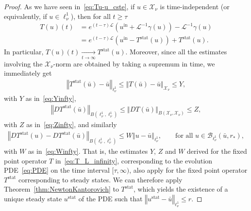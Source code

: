 \documentclass[10pt,a4paper]{article}
\theoremstyle{plain}
\newcommand{\B}{\mathcal{B}}
\renewcommand{\B}{\mathcal{B}}
\renewcommand{\L}{\mathcal{L}}
\newcommand{\X}{\mathcal{X}}
\newcommand{\bu}{\bar{u}}
\newcommand{\1}{\mathbf{1}}
\newcommand{\rstar}{r_*}
\newcommand{\uin}{{u^{\mathrm{in}}}}
\newcommand{\stat}{\mathrm{stat}}
\begin{document}
\begin{proof}
As we have seen in~\eqref{eq:Tu-u_cste}, if $u\in\X_\nu$ is time-independent (or equivalently, if $u\in\ell^1_\nu$), then for all $t\geq \tau$
\begin{align}
\label{eq:TtoTstat}
T(u)(t) &= e^{(t-\tau)\L}\left(\uin+\L^{-1}\gamma(u)\right) - \L^{-1}\gamma(u) \nonumber \\
&= e^{(t-\tau)\L}\left(\uin-T^\stat(u)\right) + T^\stat(u).
\end{align}
In particular, $T(u)(t) \underset{t\to\infty}{\longrightarrow} T^\stat(u)$. Moreover, since all the estimates involving the $\X_\nu$-norm are obtained by taking a supremum in time, we immediately get
\begin{align*}
\left\Vert T^\stat(\bu)-\bu\right\Vert_{\ell^1_\nu} \leq \left\Vert T(\bu)-\bu\right\Vert_{\X_\nu} \leq Y,
\end{align*} 
with $Y$ as in~\eqref{eq:Yinfty},
\begin{align*}
\left\Vert DT^\stat(\bu)\right\Vert_{B(\ell^1_\nu,\ell^1_\nu)} \leq \left\Vert DT(\bu)\right\Vert_{B(\X_\nu,\X_\nu)} \leq Z,
\end{align*} 
with $Z$ as in~\eqref{eq:Zinfty}, and similarly
\begin{align*}
\left\Vert DT^\stat(u)-DT^\stat(\bu)\right\Vert_{B(\ell^1_\nu,\ell^1_\nu)} \leq W \left\Vert u-\bu\right\Vert_{\ell^1_\nu},\qquad \text{for all } u\in\B_{\ell^1_\nu}(\bu,\rstar),
\end{align*} 
with $W$ as in~\eqref{eq:Winfty}. That is, the estimates $Y$, $Z$ and $W$ derived for the fixed point operator $T$ in~\eqref{eq:T_L_infinity}, corresponding to the evolution PDE~\eqref{eq:PDE} on the time interval $[\tau,\infty)$, also apply for the fixed point operator $T^\stat$ corresponding to steady states. We can therefore apply Theorem~\ref{thm:NewtonKantorovich} to $T^\stat$, which yields the existence of a unique steady state $u^\stat$ of the PDE such that $\left\Vert u^\stat - \bu \right\Vert_{\ell^1_\nu} \leq r$. 
\end{proof}
\end{document}
